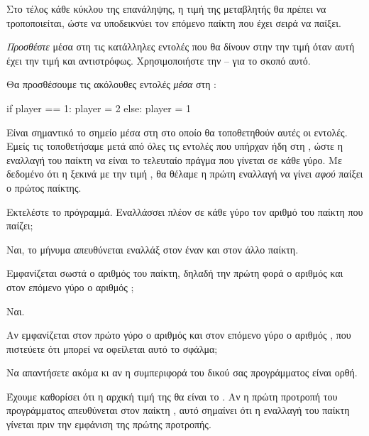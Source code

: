 \documentclass[a4paper,11pt,oneside]{book}
\begin{document}
\begin{step}
\label{step:player-switch}
Στο τέλος κάθε κύκλου της επανάληψης, η τιμή της μεταβλητής  θα πρέπει να τροποποιείται, ώστε να υποδεικνύει τον επόμενο παίκτη που έχει σειρά να παίξει. 

\emph{Προσθέστε} μέσα στη  τις κατάλληλες εντολές που θα δίνουν στην  την τιμή  όταν αυτή έχει την τιμή  και αντιστρόφως. Χρησιμοποιήστε την -- για το σκοπό αυτό. 

\begin{answer}
Θα προσθέσουμε τις ακόλουθες εντολές \emph{μέσα} στη :

\begin{pynew}
    if player == 1:
        player = 2
    else:
        player = 1
\end{pynew}

Είναι σημαντικό το σημείο μέσα στη  στο οποίο θα τοποθετηθούν αυτές οι εντολές. Εμείς τις τοποθετήσαμε μετά από όλες τις εντολές που υπήρχαν ήδη στη , ώστε η εναλλαγή του παίκτη να είναι το τελευταίο πράγμα που γίνεται σε κάθε γύρο. Με δεδομένο ότι η  ξεκινά με την τιμή , θα θέλαμε η πρώτη εναλλαγή να γίνει \emph{αφού} παίξει ο πρώτος παίκτης.
\end{answer}

Εκτελέστε το πρόγραμμά. Εναλλάσσει πλέον σε κάθε γύρο τον αριθμό του παίκτη που παίζει;

\begin{answer}
Ναι, το μήνυμα απευθύνεται εναλλάξ στον έναν και στον άλλο παίκτη. 
\end{answer}

Εμφανίζεται σωστά ο αριθμός του παίκτη, δηλαδή την πρώτη φορά ο αριθμός  και στον επόμενο γύρο ο αριθμός ; 

\begin{answer}
Ναι.
\end{answer}

Αν εμφανίζεται στον πρώτο γύρο ο αριθμός  και στον επόμενο γύρο ο αριθμός , που πιστεύετε ότι μπορεί να οφείλεται αυτό το σφάλμα;

\begin{note}
Να απαντήσετε ακόμα κι αν η συμπεριφορά του δικού σας προγράμματος είναι ορθή.
\end{note} 

\begin{answer}
Έχουμε καθορίσει ότι η αρχική τιμή της  θα είναι το . Αν η πρώτη προτροπή του προγράμματος απευθύνεται στον παίκτη , αυτό σημαίνει ότι η εναλλαγή του παίκτη γίνεται πριν την εμφάνιση της πρώτης προτροπής.
\end{answer}


\end{step}
\end{document}
